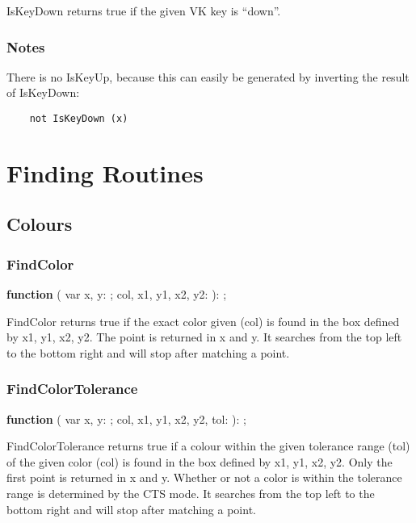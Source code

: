 \documentclass[a4paper]{report}
\begin{document}
IsKeyDown returns true if the given VK key is ``down''.

\subsection{Notes}

There is no IsKeyUp, because this can easily be generated by inverting the
result of IsKeyDown:
\begin{verbatim}
    not IsKeyDown (x)
\end{verbatim}


\chapter{Finding Routines}

\section{Colours}

\subsection{FindColor}

\textbf{function} {\color{blue}{FindColor}}({\color{typeRed}
{var x, y: }}{\color{typeGreen}{Integer}}; {\color{typeRed}
{col, x1, y1, x2, y2: }}{\color{typeGreen}{Integer}}): {\color{typeGreen}{Boolean}};

FindColor returns true if the exact color given (col) is found in the box defined by x1, y1, x2, y2.
The point is returned in x and y. It searches from the top left to the bottom right and will stop
after matching a point.

\subsection{FindColorTolerance}

\textbf{function} {\color{blue}{FindColorTolerance}}({\color{typeRed }
{var x, y: }}{\color{typeGreen}{Integer}}; {\color{typeRed}
{col, x1, y1, x2, y2, tol: }}{\color{typeGreen}{Integer}}): {\color{typeGreen}{Boolean}};

FindColorTolerance returns true if a colour within the given tolerance range (tol) of the given color (col)
is found in the box defined by x1, y1, x2, y2. Only the first point is returned in x and y.
Whether or not a color is within the tolerance range is determined by the CTS mode.
It searches from the top left to the bottom right and will stop after matching a point.
\end{document}
